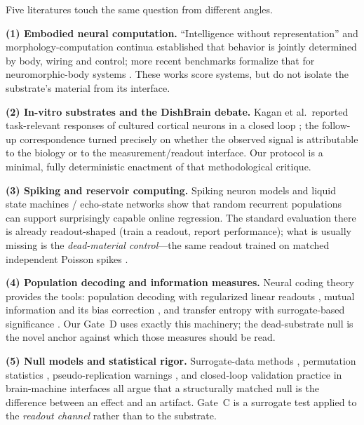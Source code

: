 \documentclass[10pt,a4paper]{article}
\begin{document}
Five literatures touch the same question from different angles.

\textbf{(1) Embodied neural computation.} ``Intelligence without
representation'' \cite{brooks1991} and morphology-computation continua
\cite{pfeifer2006how} established that behavior is jointly determined
by body, wiring and control; more recent benchmarks formalize that for
neuromorphic-body systems \cite{dangelo2026benchmark}. These works
score systems, but do not isolate the substrate's material from its
interface.

\textbf{(2) In-vitro substrates and the DishBrain debate.} Kagan et
al.\ reported task-relevant responses of cultured cortical neurons in a
closed loop \cite{kagan2022dishbrain}; the follow-up correspondence
\cite{balci2023neurons,kagan2023semantics} turned precisely on whether
the observed signal is attributable to the biology or to the
measurement/readout interface. Our protocol is a minimal, fully
deterministic enactment of that methodological critique.

\textbf{(3) Spiking and reservoir computing.} Spiking neuron models
\cite{maass1997,izhikevich2003,izhikevich2004,gerstner2002} and liquid
state machines / echo-state networks \cite{maass2002liquid,
jaeger2001echo,lukosevicius2009} show that random recurrent populations
can support surprisingly capable online regression. The standard
evaluation there is already readout-shaped (train a readout, report
performance); what is usually missing is the \emph{dead-material
control}---the same readout trained on matched independent Poisson
spikes \cite{lukosevicius2009}.

\textbf{(4) Population decoding and information measures.} Neural
coding theory provides the tools: population decoding with regularized
linear readouts \cite{georgopoulos1986,quiroga2009,paninski2004,
hoerl1970}, mutual information and its bias correction
\cite{shannon1948,kraskov2004,panzeri2007}, and transfer entropy with
surrogate-based significance \cite{schreiber2000,walker2018}. Our Gate~D
uses exactly this machinery; the dead-substrate null is the novel
anchor against which those measures should be read.

\textbf{(5) Null models and statistical rigor.} Surrogate-data methods
\cite{theiler1992}, permutation statistics \cite{ernst2004},
pseudo-replication warnings \cite{hurlbert1984}, and closed-loop
validation practice in brain-machine interfaces
\cite{carmena2003,nicolelis2003} all argue that a structurally matched
null is the difference between an effect and an artifact. Gate~C is a
surrogate test applied to the \emph{readout channel} rather than to the
substrate.
\end{document}
